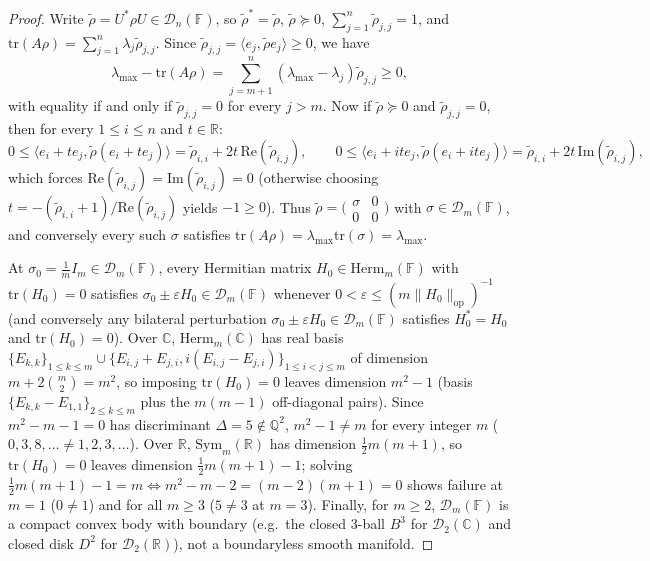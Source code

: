 \documentclass[11pt,a4paper]{article}
\newcommand{\smmat}[1]{\bigl(\begin{smallmatrix}#1\end{smallmatrix}\bigr)}
\theoremstyle{definition}
\theoremstyle{remark}
\newcommand{\RR}{\mathbb{R}}
\newcommand{\CC}{\mathbb{C}}
\newcommand{\QQ}{\mathbb{Q}}
\newcommand{\FF}{\mathbb{F}}
\newcommand{\cD}{\mathcal{D}}
\newcommand{\Herm}{\mathrm{Herm}}
\newcommand{\Sym}{\mathrm{Sym}}
\newcommand{\tr}{\mathrm{tr}}
\newcommand{\im}{\mathrm{Im}}
\newcommand{\re}{\mathrm{Re}}
\begin{document}
\begin{proof}
Write $\tilde{\rho} = U^* \rho U \in \cD_n(\FF)$, so $\tilde{\rho}^* = \tilde{\rho}$, $\tilde{\rho} \succeq 0$, $\sum_{j=1}^n \tilde{\rho}_{j,j} = 1$, and $\tr(A \rho) = \sum_{j=1}^n \lambda_j \tilde{\rho}_{j,j}$. Since $\tilde{\rho}_{j,j} = \langle e_j, \tilde{\rho} e_j \rangle \ge 0$, we have
\[
  \lambda_{\max} - \tr(A \rho) = \sum_{j=m+1}^n (\lambda_{\max} - \lambda_j) \tilde{\rho}_{j,j} \ge 0,
\]
with equality if and only if $\tilde{\rho}_{j,j} = 0$ for every $j > m$. Now if $\tilde{\rho} \succeq 0$ and $\tilde{\rho}_{j,j} = 0$, then for every $1 \le i \le n$ and $t \in \RR$:
\[
  0 \le \langle e_i + t e_j, \tilde{\rho}(e_i + t e_j) \rangle = \tilde{\rho}_{i,i} + 2 t\,\re(\tilde{\rho}_{i,j}), \qquad
  0 \le \langle e_i + i t e_j, \tilde{\rho}(e_i + i t e_j) \rangle = \tilde{\rho}_{i,i} + 2 t\,\im(\tilde{\rho}_{i,j}),
\]
which forces $\re(\tilde{\rho}_{i,j}) = \im(\tilde{\rho}_{i,j}) = 0$ (otherwise choosing $t = -(\tilde{\rho}_{i,i} + 1)/\re(\tilde{\rho}_{i,j})$ yields $-1 \ge 0$). Thus $\tilde{\rho} = \smmat{\sigma & 0 \\ 0 & 0}$ with $\sigma \in \cD_m(\FF)$, and conversely every such $\sigma$ satisfies $\tr(A \rho) = \lambda_{\max} \tr(\sigma) = \lambda_{\max}$.

At $\sigma_0 = \frac{1}{m} I_m \in \cD_m(\FF)$, every Hermitian matrix $H_0 \in \Herm_m(\FF)$ with $\tr(H_0) = 0$ satisfies $\sigma_0 \pm \varepsilon H_0 \in \cD_m(\FF)$ whenever $0 < \varepsilon \le (m \|H_0\|_{\mathrm{op}})^{-1}$ (and conversely any bilateral perturbation $\sigma_0 \pm \varepsilon H_0 \in \cD_m(\FF)$ satisfies $H_0^* = H_0$ and $\tr(H_0) = 0$). Over $\CC$, $\Herm_m(\CC)$ has real basis $\{E_{k,k}\}_{1 \le k \le m} \cup \{E_{i,j} + E_{j,i}, i(E_{i,j} - E_{j,i})\}_{1 \le i < j \le m}$ of dimension $m + 2\binom{m}{2} = m^2$, so imposing $\tr(H_0) = 0$ leaves dimension $m^2 - 1$ (basis $\{E_{k,k} - E_{1,1}\}_{2 \le k \le m}$ plus the $m(m-1)$ off-diagonal pairs). Since $m^2 - m - 1 = 0$ has discriminant $\Delta = 5 \notin \QQ^2$, $m^2 - 1 \neq m$ for every integer $m$ ($0, 3, 8, \dots \neq 1, 2, 3, \dots$). Over $\RR$, $\Sym_m(\RR)$ has dimension $\frac{1}{2}m(m+1)$, so $\tr(H_0) = 0$ leaves dimension $\frac{1}{2}m(m+1) - 1$; solving $\frac{1}{2}m(m+1) - 1 = m \iff m^2 - m - 2 = (m - 2)(m + 1) = 0$ shows failure at $m = 1$ ($0 \neq 1$) and for all $m \ge 3$ ($5 \neq 3$ at $m = 3$). Finally, for $m \ge 2$, $\cD_m(\FF)$ is a compact convex body with boundary (e.g.\ the closed $3$-ball $B^3$ for $\cD_2(\CC)$ and closed disk $D^2$ for $\cD_2(\RR)$), not a boundaryless smooth manifold.
\end{proof}
\end{document}
